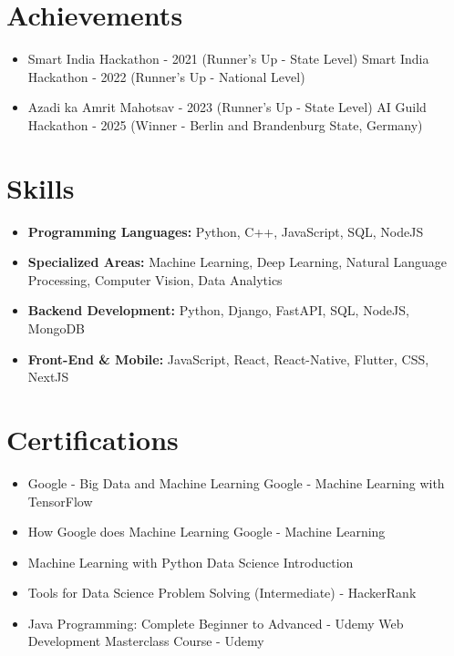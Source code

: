 \documentclass[a4paper,10pt]{article}
\begin{document}
\section*{Achievements}
\begin{itemize}
\item Smart India Hackathon - 2021 (Runner's Up - State Level) \hfill Smart India Hackathon - 2022 (Runner's Up - National Level)
\item Azadi ka Amrit Mahotsav - 2023 (Runner's Up - State Level) \hfill AI Guild Hackathon - 2025 (Winner - Berlin and Brandenburg State, Germany)
\end{itemize}

\section*{Skills}
\begin{itemize}
  \item \textbf{Programming Languages:} Python, C++, JavaScript, SQL, NodeJS
  \item \textbf{Specialized Areas:} Machine Learning, Deep Learning, Natural Language Processing, Computer Vision, Data Analytics
  \item \textbf{Backend Development:} Python, Django, FastAPI, SQL, NodeJS, MongoDB
  \item \textbf{Front-End \& Mobile:} JavaScript, React, React-Native, Flutter, CSS, NextJS
\end{itemize}

\section*{Certifications}
\begin{itemize}
\item Google - Big Data and Machine Learning \hfill Google - Machine Learning with TensorFlow
\item How Google does Machine Learning \hfill Google - Machine Learning
\item Machine Learning with Python \hfill Data Science Introduction
\item Tools for Data Science \hfill Problem Solving (Intermediate) - HackerRank
\item Java Programming: Complete Beginner to Advanced - Udemy \hfill Web Development Masterclass Course - Udemy
\end{itemize}
\end{document}

